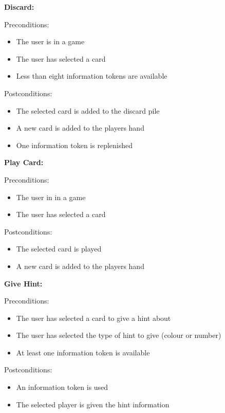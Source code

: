 \documentclass[12pt]{article}
\begin{document}
\begin{description}
\item
\begin{description}
	\item \textbf{Discard:}
	\item Preconditions:
		\begin{itemize}
		\item The user is in a game
		\item The user has selected a card
		\item Less than eight information tokens are available
		\end{itemize}	
	\item Postconditions:
		\begin{itemize}
		\item The selected card is added to the discard pile
		\item A new card is added to the players hand
		\item One information token is replenished
		\end{itemize}
\end{description}

\item
\begin{description}
	\item \textbf{Play Card:}
	\item Preconditions:
		\begin{itemize}
		\item The user in in a game
		\item The user has selected a card
		\end{itemize}	
	\item Postconditions:
		\begin{itemize}
		\item The selected card is played
		\item A new card is added to the players hand
		\end{itemize}
\end{description}

\item
\begin{description}
	\item \textbf{Give Hint:}
	\item Preconditions:
		\begin{itemize}
		\item The user has selected a card to give a hint about
		\item The user has selected the type of hint to give (colour or number)
		\item At least one information token is available
		\end{itemize}	
	\item Postconditions:
		\begin{itemize}
		\item An information token is used
		\item The selected player is given the hint information
		\end{itemize}
\end{description}


\end{description}
\end{document}
